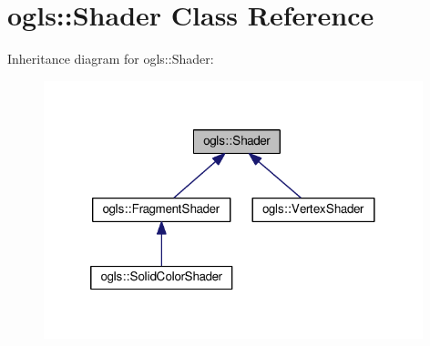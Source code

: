 \hypertarget{classogls_1_1Shader}{\section{ogls\-:\-:Shader Class Reference}
\label{classogls_1_1Shader}
}


Inheritance diagram for ogls\-:\-:Shader\-:\nopagebreak
\begin{figure}[H]
\begin{center}
\leavevmode
\includegraphics[width=312pt]{de/dba/classogls_1_1Shader__inherit__graph}
\end{center}
\end{figure}

